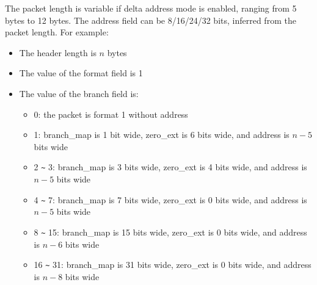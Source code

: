 \documentclass[main\_\_EN.tex]{subfiles}
\begin{document}
The packet length is variable if delta address mode is enabled, ranging from 5 bytes to 12 bytes. The address field can be 8/16/24/32 bits, inferred from the packet length. For example:
\begin{itemize}
    \item The header length is $n$ bytes
    \item The value of the format field is 1
    \item The value of the branch field is:
        \begin{itemize}
            \item 0: the packet is format 1 without address
            \item 1: branch\_map is 1 bit wide, zero\_ext is 6 bits wide, and address is $n-5$ bits wide
            \item 2 \verb+~+ 3:  branch\_map is 3 bits wide, zero\_ext is 4 bits wide, and address is $n-5$ bits wide
            \item 4 \verb+~+ 7: branch\_map is 7 bits wide, zero\_ext is 0 bits wide, and address is $n-5$ bits wide
            \item 8 \verb+~+ 15: branch\_map is 15 bits wide, zero\_ext is 0 bits wide, and address is $n-6$ bits wide
            \item 16 \verb+~+ 31: branch\_map is 31 bits wide, zero\_ext is 0 bits wide, and address is $n-8$ bits wide
        \end{itemize}
\end{itemize}
\end{document}

